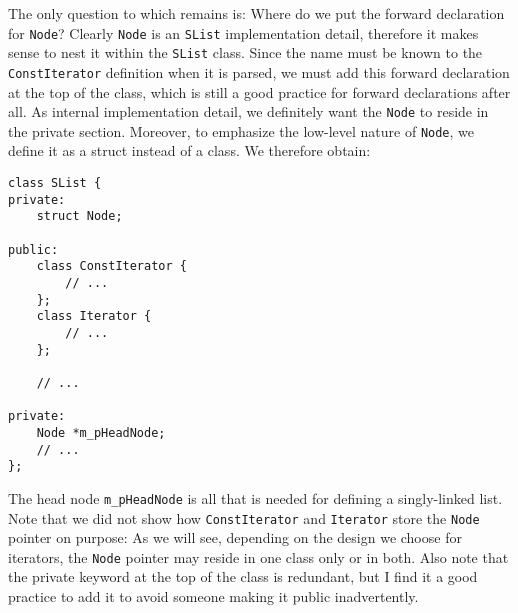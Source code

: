 The only question to which remains is: Where do we put the forward declaration for \lstinline!Node!? Clearly \lstinline!Node! is an \lstinline!SList! implementation detail, therefore it makes sense to nest it within the \lstinline!SList! class. Since the name must be known to the \lstinline!ConstIterator! definition when it is parsed, we must add this forward declaration at the top of the class, which is still a good practice for forward declarations after all. As internal implementation detail, we definitely want the \lstinline!Node! to reside in the private section. Moreover, to emphasize the low-level nature of \lstinline!Node!, we define it as a struct instead of a class. We therefore obtain:
\begin{lstlisting}[frame=single, caption={SList.h}]
class SList {
private:
    struct Node;
        
public:
    class ConstIterator {
        // ...
    };
    class Iterator {
        // ...
    };
    
    // ...
    
private:
    Node *m_pHeadNode;
    // ...
};
\end{lstlisting}
The head node \lstinline!m_pHeadNode! is all that is needed for defining a singly-linked list. Note that we did not show how \lstinline!ConstIterator! and \lstinline!Iterator! store the \lstinline!Node! pointer on purpose: As we will see, depending on the design we choose for iterators, the \lstinline!Node! pointer may reside in one class only or in both. Also note that the private keyword at the top of the class is redundant, but I find it a good practice to add it to avoid someone making it public inadvertently.

